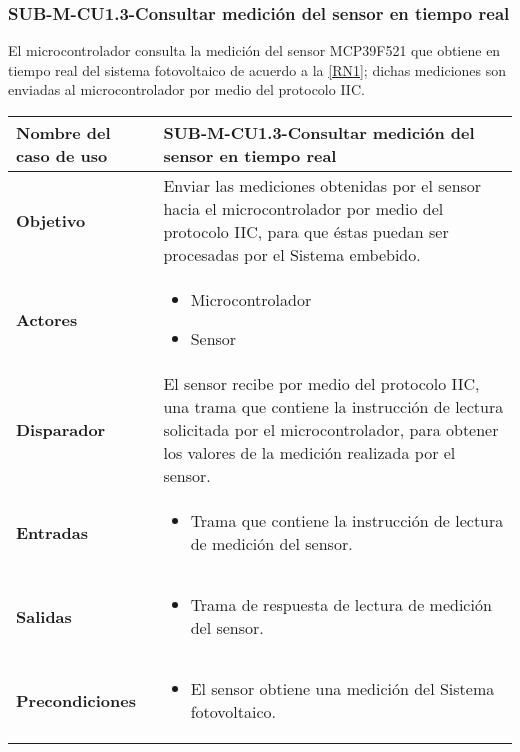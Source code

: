 \subsubsection{SUB-M-CU1.3-Consultar medición del sensor en tiempo real}\label{SUB-M-CU1.3}
El microcontrolador consulta la medición del sensor MCP39F521 que obtiene en tiempo real del sistema fotovoltaico de acuerdo a la \ref{RN1}; dichas mediciones son enviadas al microcontrolador por medio del protocolo IIC.
\begin{longtable}{|J{5cm}|J{10.3cm}|}
	\hline
	\textbf{Nombre del caso de uso} &
		SUB-M-CU1.3-Consultar medición del sensor en tiempo real \\ \hline
	\textbf{Objetivo} &
		Enviar las mediciones obtenidas por el sensor hacia el microcontrolador por medio del protocolo IIC, para que éstas puedan ser procesadas por el Sistema embebido. \\ \hline
	\textbf{Actores} &
	    \begin{itemize}
		    \item Microcontrolador
		    \item Sensor
		\end{itemize}\\ \hline 
	\textbf{Disparador} & 
		El sensor recibe por medio del protocolo IIC, una trama que contiene la instrucción de lectura solicitada por el microcontrolador, para obtener los valores de la medición realizada por el sensor. \\ \hline 
	\textbf{Entradas} & 
		\begin{itemize}
				\item Trama que contiene la instrucción de lectura de medición del sensor.
		\end{itemize}\\ \hline 
	\textbf{Salidas} & 
	    \begin{itemize}
	        \item Trama de respuesta de lectura de medición del sensor.
	    \end{itemize}\\ \hline
	\textbf{Precondiciones} & 
		\begin{itemize}
		    \item El sensor obtiene una medición del Sistema fotovoltaico.
		\end{itemize}\\ \hline

\end{longtable}
